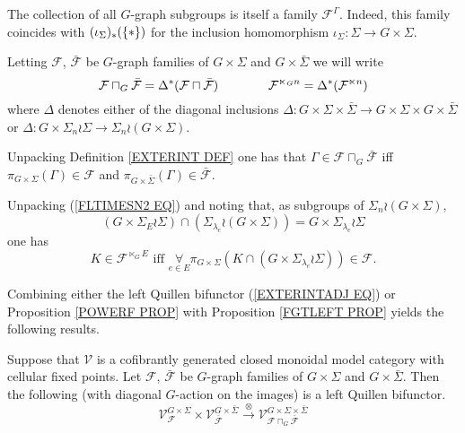 \documentclass[a4paper,10pt]{article}%
\begin{document}
\begin{remark}
	The collection of all $G$-graph subgroups is itself a family $\mathcal{F}^{\Gamma}$. Indeed, this family  coincides with 
	$(\iota_{\Sigma})_{\**}(\{\**\})$
for the inclusion homomorphism 
$\iota_{\Sigma} \colon \Sigma \to G \times \Sigma$.
\end{remark}


\begin{notation}\label{SEMIDIRG NOT}
Letting $\mathcal{F}$, $\bar{\mathcal{F}}$ be $G$-graph families of $G \times \Sigma$ and $G \times \bar{\Sigma}$ we will write
\[
	\mathcal{F} \sqcap_G \bar{\mathcal{F}} 
	= \Delta^{\**} (\mathcal{F} \sqcap \bar{\mathcal{F}} )
\qquad \qquad
	\mathcal{F}^{\ltimes_G n} = \Delta^{\**} (\mathcal{F}^{\ltimes n})
\]
where $\Delta$ denotes either of the diagonal inclusions
$\Delta \colon 
G \times \Sigma \times \bar{\Sigma} \to 
G \times \Sigma \times G \times \bar{\Sigma}$
or 
$\Delta \colon G \times \Sigma_n \wr \Sigma \to 
\Sigma_n \wr (G \times \Sigma)$.
\end{notation}


\begin{remark}\label{UNPACKINGSQCAP REM}
	Unpacking Definition \ref{EXTERINT DEF} one has that 
	$\Gamma \in \mathcal{F} \sqcap_G \bar{\mathcal{F}}$ iff
	$\pi_{G \times \Sigma}(\Gamma) \in \mathcal{F}$ and
	$\pi_{G \times \bar{\Sigma}}(\Gamma) \in \bar{\mathcal{F}}$.
\end{remark}


\begin{remark}\label{UNPACKINGLTIMES REM}
Unpacking (\ref{FLTIMESN2 EQ}) and noting that,
as subgroups of $\Sigma_n \wr (G \times \Sigma)$,
\[
	\left(G \times \Sigma_E \wr \Sigma\right)
\cap
	\left(
	\Sigma_{\lambda_e} \wr (G \times \Sigma)
	\right)
=
	G \times \Sigma_{\lambda_e} \wr \Sigma
\]
 one has  
\[
	K \in \mathcal{F}^{\ltimes_G E} 
	\text{ iff }
	\underset{e \in E}{\forall} \pi_{G \times \Sigma}
	\left(
		K \cap 
		\left(G \times \Sigma_{\lambda_e} \wr \Sigma \right)
	\right)
	\in \mathcal{F}.
\]
\end{remark}


Combining either the left Quillen bifunctor (\ref{EXTERINTADJ EQ}) or 
Proposition \ref{POWERF PROP}
with Proposition \ref{FGTLEFT PROP} yields the following results.


\begin{proposition}\label{EXTERINTADJG PROP}
Suppose that $\mathcal{V}$ is a cofibrantly generated closed monoidal model category with cellular fixed points.
Let $\mathcal{F}$, $\bar{\mathcal{F}}$ be $G$-graph families of 
$G \times \Sigma$ and $G \times \bar{\Sigma}$. Then the following (with diagonal $G$-action on the images) 
is a left Quillen bifunctor.
\[
	\mathcal{V}^{G \times \Sigma}_{\mathcal{F}}
		\times
	\mathcal{V}^{G \times \bar{\Sigma}}_{\bar{\mathcal{F}}}
		\xrightarrow{\otimes}
		\mathcal{V}^{G \times \Sigma \times \bar{\Sigma}}_{
	\mathcal{F} \sqcap_G \bar{\mathcal{F}}}
\]
\end{proposition}
\end{document}
